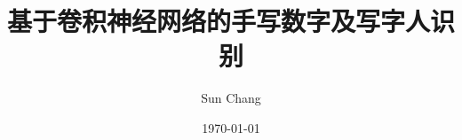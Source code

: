 \documentclass[UTF8, twoside, 12pt]{ctexart}
\numberwithin{equation}{section}
\begin{document}
\title{基于卷积神经网络的手写数字及写字人识别}
\author{Sun Chang}
\date{\today}

\newcommand{\authorname}{Your name}
\newcommand{\school}{Your school}
\newcommand{\major}{Your major}
\newcommand{\studentid}{Your student id}
\newcommand{\tutor}{Your tutor}
\newcommand{\submitdate}{2024年\ 05月\ 00日}












\printbibliography[title={参考文献}]
\newpage



\end{document}
